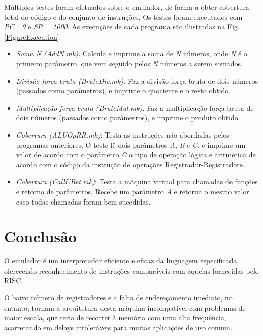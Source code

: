 \documentclass[12pt, a4paper]{article}
\begin{document}
Múltiplos testes foram efetuados sobre o emulador, de forma a obter cobertura total do código e do conjunto de instruções. Os testes foram executados com \emph{PC= 0} e \emph{SP = 1000}. As execuções de cada programa são ilustradas na Fig. \ref{FigureExecution}.

\begin{itemize}
\item \emph{Soma N (AddN.mk):} Calcula e imprime a soma de \emph{N} números, onde \emph{N} é o primeiro parâmetro, que vem seguido pelos \emph{N} números a serem somados.
\item \emph{Divisão força bruta (BruteDiv.mk):} Faz a divisão força bruta de dois números (passados como parâmetros), e imprime o quociente e o resto obtido.
\item \emph{Multiplicação força bruta (BruteMul.mk):} Faz a multiplicação força bruta de dois números (passados como parâmetros), e imprime o produto obtido.
\item \emph{Cobertura (ALUOpRR.mk)}: Testa as instruções não abordadas pelos programas anteriores; O teste lê dois parâmetros \emph{A}, \emph{B} e \emph{C}, e imprime um valor de acordo com o parâmetro \emph{C} o tipo de operação lógica e aritmética de acordo com o código da instrução de operações Registrador-Registradore. 
\item \emph{Cobertura (Call{\&}Ret.mk)}: Testa a máquina virtual para chamadas de funções e retorno de parâmetros. Recebe um parâmetro \emph{A} e retorna o mesmo valor caso todas chamadas foram bem sucedidas.
\end{itemize}

\section{Conclusão}

O emulador é um interpretador eficiente e eficaz da linguagem especificada, oferecendo reconhecimento de instruções comparáveis com aquelas fornecidas pelo RISC. 

O baixo número de registradores e a falta de endereçamento imediato, no entanto, tornam a arquitetura desta máquina incompatível com problemas de maior escala, que teria de recorrer à memória com uma alta frequência, acarretando em delays intoleráveis para muitas aplicações de uso comum.
\end{document}
